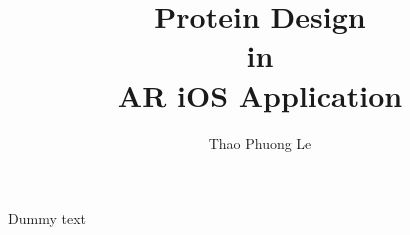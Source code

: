 \documentclass[MSCIM]{mscim}
\begin{document}

\title{Protein Design\\ in \\ AR iOS Application}
\author{Thao Phuong Le}

\beforeabstract

Dummy text

\afterabstract




\printbibliography
\end{document}

